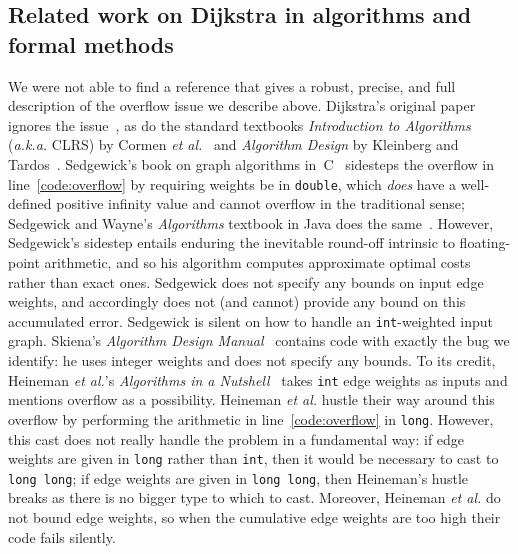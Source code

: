 \subsection{Related work on Dijkstra in algorithms and formal methods}
\label{sec:relworkdijkstra}
We were not able to find a reference that gives a robust, precise,
and full description of the overflow issue we describe above.
Dijkstra's original paper ignores the issue~\cite{DBLP:journals/nm/Dijkstra59}, as do the standard textbooks \emph{Introduction to Algorithms} (\emph{a.k.a.} CLRS) by Cormen \emph{et al.}~\cite{clrs} and \emph{Algorithm Design} by Kleinberg and Tardos~\cite{DBLP:books/daglib/0015106}.
Sedgewick's book on graph algorithms in~C~\cite{sedgewick} sidesteps the overflow in line~\ref{code:overflow} by requiring weights be in \texttt{double}, which \emph{does} have a well-defined positive infinity value and cannot overflow in the traditional sense; Sedgewick and Wayne's \emph{Algorithms} textbook in Java does the same~\cite{DBLP:books/daglib/0029345}.  However, Sedgewick's sidestep entails enduring the inevitable round-off intrinsic to floating-point arithmetic, and so his algorithm computes approximate optimal costs rather than exact ones.  Sedgewick does not specify any bounds on input edge weights, and accordingly does not (and cannot) provide any bound on this accumulated error.  Sedgewick is silent on how to handle an \texttt{int}-weighted input graph.  Skiena's \emph{Algorithm Design Manual}~\cite{DBLP:books/daglib/0022194} contains code with exactly the bug we identify: he uses integer weights and does not specify any bounds.  To its credit, Heineman \emph{et al.}'s \emph{Algorithms in a Nutshell}~\cite{heineman2008algorithms} takes \texttt{int} edge weights as inputs and mentions overflow as a possibility.  Heineman \emph{et al.} hustle their way around this overflow by performing the arithmetic in line~\ref{code:overflow} in \texttt{long}.  However, this cast does not really handle the problem in a fundamental way: if edge weights are given in \texttt{long} rather than \texttt{int}, then it would be necessary to cast to \texttt{long long}; if edge weights are given in \texttt{long long}, then Heineman's hustle breaks as there is no bigger type to which to cast.  Moreover, Heineman \emph{et al.} do not bound edge weights, so when the cumulative edge weights are too high their code fails silently. %


